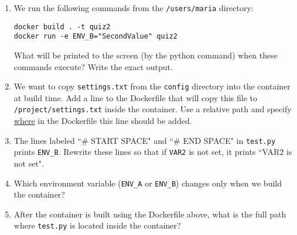 \documentclass[11pt]{article}
\begin{document}
\begin{enumerate}

\item We run the following commands from the \texttt{/users/maria} directory:
\begin{verbatim}
docker build . -t quiz2
docker run -e ENV_B="SecondValue" quiz2
\end{verbatim}

What will be printed to the screen (by the python command) when these commands execute? Write the exact output.

\vspace{3cm}

\item We want to copy \texttt{settings.txt} from the \texttt{config} directory into the container at build time. Add a line to the Dockerfile that will copy this file to \texttt{/project/settings.txt} inside the container. Use a relative path and specify \underline{where} in the Dockerfile this line should be added.

\vspace{4cm}

\item The lines labeled ``\# START SPACE" and ``\# END SPACE" in \texttt{test.py} prints \texttt{ENV\_B}. Rewrite these lines so that if \texttt{VAR2} is not set, it prints ``VAR2 is not set".

\vspace{5cm}

\item Which environment variable (\texttt{ENV\_A} or \texttt{ENV\_B}) changes only when we build the container? 

\vspace{3cm}

\item After the container is built using the Dockerfile above, what is the full path where \texttt{test.py} is located inside the container? 

\end{enumerate}
\end{document}
